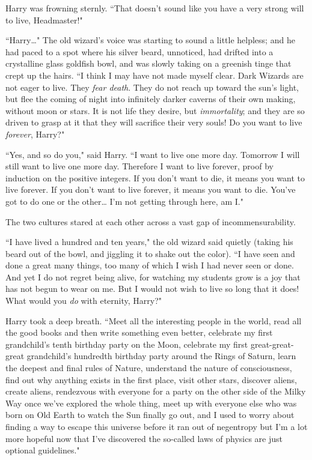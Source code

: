 Harry was frowning sternly. ``That doesn't sound like you have a very strong will to live, Headmaster!"

``Harry{\ldots}" The old wizard's voice was starting to sound a little helpless; and he had paced to a spot where his silver beard, unnoticed, had drifted into a crystalline glass goldfish bowl, and was slowly taking on a greenish tinge that crept up the hairs. ``I think I may have not made myself clear. Dark Wizards are not eager to live. They \emph{fear death}. They do not reach up toward the sun's light, but flee the coming of night into infinitely darker caverns of their own making, without moon or stars. It is not life they desire, but \emph{immortality}; and they are so driven to grasp at it that they will sacrifice their very souls! Do you want to live \emph{forever}, Harry?"

``Yes, and so do you," said Harry. ``I want to live one more day. Tomorrow I will still want to live one more day. Therefore I want to live forever, proof by induction on the positive integers. If you don't want to die, it means you want to live forever. If you don't want to live forever, it means you want to die. You've got to do one or the other{\ldots} I'm not getting through here, am I."

The two cultures stared at each other across a vast gap of incommensurability.

``I have lived a hundred and ten years," the old wizard said quietly (taking his beard out of the bowl, and jiggling it to shake out the color). ``I have seen and done a great many things, too many of which I wish I had never seen or done. And yet I do not regret being alive, for watching my students grow is a joy that has not begun to wear on me. But I would not wish to live so long that it does! What would you \emph{do} with eternity, Harry?"

Harry took a deep breath. ``Meet all the interesting people in the world, read all the good books and then write something even better, celebrate my first grandchild's tenth birthday party on the Moon, celebrate my first great-great-great grandchild's hundredth birthday party around the Rings of Saturn, learn the deepest and final rules of Nature, understand the nature of consciousness, find out why anything exists in the first place, visit other stars, discover aliens, create aliens, rendezvous with everyone for a party on the other side of the Milky Way once we've explored the whole thing, meet up with everyone else who was born on Old Earth to watch the Sun finally go out, and I used to worry about finding a way to escape this universe before it ran out of negentropy but I'm a lot more hopeful now that I've discovered the so-called laws of physics are just optional guidelines."

